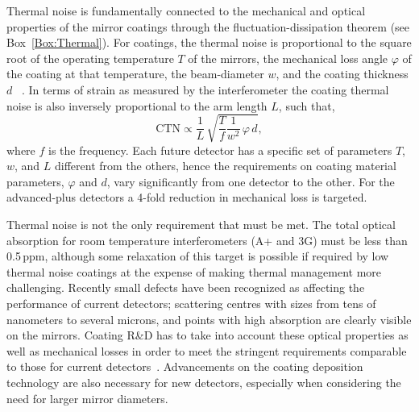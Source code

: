 Thermal noise is fundamentally connected to the mechanical and optical properties of the mirror coatings through the fluctuation-dissipation theorem (see Box~\ref{Box:Thermal}). For coatings, the thermal noise is proportional to the square root of the operating temperature $T$ of the mirrors, the mechanical loss angle  $\varphi$ of the coating at that temperature, the beam-diameter $w$, and the coating thickness $d$ ~\cite{levin1998internal}. In terms of strain as measured by the interferometer the coating thermal noise is also inversely proportional to the arm length $L$, such that,
\begin{equation}
\text{CTN} \propto \frac{1}{L} \, \sqrt{\frac{T}{f} \frac{1}{w^2} \, \varphi \, d   },
\end{equation}\label{eq:CTN}
where $f$ is the frequency. Each future detector has a specific set of parameters $T$, $w$, and $L$ different from the others, hence the requirements on coating material parameters, $\varphi$ and $d$, vary significantly from one detector to the other. For the advanced-plus detectors a 4-fold reduction in mechanical loss is targeted.


Thermal noise is not the only requirement that must be met. The total optical absorption for room temperature interferometers (A+ and 3G) must be less than 0.5\,ppm, although some relaxation of this target is possible if required by low thermal noise coatings at the expense of making thermal management more challenging. Recently small defects have been recognized as affecting the performance of current detectors; scattering centres with sizes from tens of nanometers to several microns, and points with high absorption are clearly visible on the mirrors. Coating R\&D has to take into account these optical properties as well as mechanical losses in order to meet the stringent requirements comparable to those for current detectors~\cite{AdvancedLIGO2015,AdvancedVirgo2015}. Advancements on the coating deposition technology are also necessary for new detectors, especially when considering the need for larger mirror diameters. 

